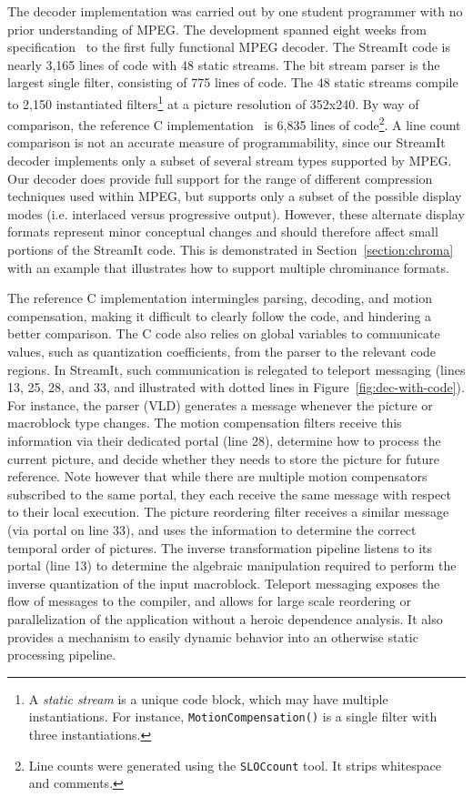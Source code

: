 The decoder implementation was carried out by one student programmer
with no prior understanding of MPEG. The development spanned eight
weeks from specification~\cite{MPEG2} to the first fully functional
MPEG decoder. The StreamIt code is nearly 3,165 lines of code with 48
static streams. The bit stream parser is the largest single filter,
consisting of 775 lines of code. The 48 static streams compile to
2,150 instantiated filters\footnote{A  {\it static stream} is a unique
code block, which may have multiple instantiations. For instance,
\texttt{MotionCompensation()} is a single filter with three
instantiations.} at a picture resolution of 352x240. By way of
comparison, the reference C implementation~\cite{reference-mpeg-c} is
6,835 lines of code\footnote{Line counts were generated using  the
\texttt{SLOCcount} tool. It strips whitespace and comments.}.  A line
count comparison is not an accurate measure of programmability, since
our StreamIt decoder implements only a subset of several stream types
supported by MPEG.  Our decoder does provide full support for the
range of different compression techniques used within MPEG, but
supports only a subset of the possible display modes (i.e. interlaced
versus progressive output).  However, these alternate display formats
represent minor conceptual changes and should therefore affect small
portions of the StreamIt code. This is demonstrated in
Section~\ref{section:chroma} with an example that illustrates how to
support multiple chrominance formats.

The reference C implementation intermingles parsing, decoding, and
motion compensation, making it difficult to clearly follow the code,
and hindering a better comparison. The C code also relies on global
variables to communicate values, such as quantization coefficients,
from the parser to the relevant code regions. In StreamIt, such
communication is relegated to teleport messaging (lines 13, 25, 28, and
33, and illustrated with dotted lines in
Figure~\ref{fig:dec-with-code}). For instance, the parser (VLD)
generates a message whenever the picture or macroblock type
changes. The motion compensation filters receive this information via
their dedicated portal (line 28), determine how to process the current
picture, and decide whether they needs to store the picture for future
reference. Note however that while there are multiple motion compensators
subscribed to the same portal, they each receive the same message with
respect to their local execution.
The picture reordering filter receives a similar message
(via portal on line 33), and uses the information to determine the
correct temporal order of pictures. The inverse transformation
pipeline listens to its portal (line 13) to determine the algebraic
manipulation required to perform the inverse quantization of the input
macroblock. Teleport messaging 
exposes the flow of messages to the compiler, and allows for large
scale reordering or parallelization of the application without a
heroic dependence analysis. It also provides a mechanism to easily
dynamic behavior into an otherwise static processing pipeline.

